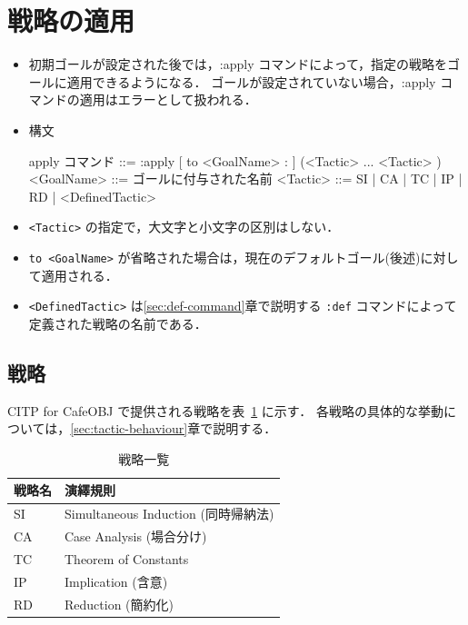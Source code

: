 \documentclass[a4paper,oneside,10pt,here]{memoir}
\newenvironment{vvtm}%
{\parskip=0pt\lineskip=0pt\begin{center}\begin{minipage}{0.8\textwidth}\begin{snugshade}}%
  {\end{snugshade}\end{minipage}\end{center}}
\begin{document}
\section{戦略の適用}\label{sec:apply}

\begin{itemize}
\item 初期ゴールが設定された後では，:apply コマンドによって，指定の戦略をゴールに適用できるようになる．
  ゴールが設定されていない場合，:apply コマンドの適用はエラーとして扱われる．
\item 構文
  \begin{vvtm}
    \begin{simplev}
    apply コマンド ::= :apply [ to <GoalName> : ] (<Tactic> ... <Tactic> )
    <GoalName>     ::= ゴールに付与された名前
    <Tactic>       ::= SI | CA | TC | IP | RD | <DefinedTactic>
    \end{simplev}
  \end{vvtm}

\item \verb|<Tactic>| の指定で，大文字と小文字の区別はしない．
\item \verb|to <GoalName>| が省略された場合は，現在のデフォルトゴール(後述)に対して適用される．
\item \verb|<DefinedTactic>| は\ref{sec:def-command}章で説明する \verb|:def| コマンドによって定義された戦略の名前である．
\end{itemize}

\subsection{戦略}\label{sec:predefined-tactics}
CITP for CafeOBJ で提供される戦略を表~\ref{tab:tactics} に示す．
各戦略の具体的な挙動については，\ref{sec:tactic-behaviour}章で説明する．

\begin{table}
\label{tab:tactics}
\caption{戦略一覧}
\begin{center}
\begin{tabular}[htbp]{|l|l|}\hline
戦略名 & 演繹規則 \\\hline\hline
SI & Simultaneous Induction (同時帰納法) \\\hline
CA & Case Analysis (場合分け)\\\hline
TC & Theorem of Constants  \\\hline
IP & Implication (含意)\\\hline
RD & Reduction (簡約化) \\\hline
\end{tabular}
\end{center}
\end{table}
\end{document}
